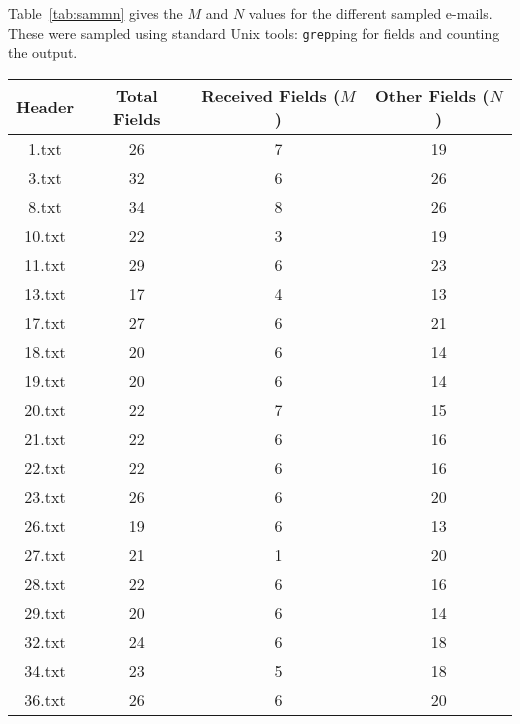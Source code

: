 Table~\ref{tab:sammn} gives the $M$ and $N$ values for the different sampled e-mails.  These were sampled using standard Unix tools: \texttt{grep}ping for fields and counting the output.

\begin{table}
\centering
\begin{tabular}{@{}cccc@{}}
\toprule
Header & Total Fields & Received Fields ($M$) & Other Fields ($N$) \\ \midrule
1.txt  & 26           & 7                     & 19                 \\
3.txt  & 32           & 6                     & 26                 \\
8.txt  & 34           & 8                     & 26                 \\
10.txt & 22           & 3                     & 19                 \\
11.txt & 29           & 6                     & 23                 \\
13.txt & 17           & 4                     & 13                 \\
17.txt & 27           & 6                     & 21                 \\
18.txt & 20           & 6                     & 14                 \\
19.txt & 20           & 6                     & 14                 \\
20.txt & 22           & 7                     & 15                 \\
21.txt & 22           & 6                     & 16                 \\
22.txt & 22           & 6                     & 16                 \\
23.txt & 26           & 6                     & 20                 \\
26.txt & 19           & 6                     & 13                 \\
27.txt & 21           & 1                     & 20                 \\
28.txt & 22           & 6                     & 16                 \\
29.txt & 20           & 6                     & 14                 \\
32.txt & 24           & 6                     & 18                 \\
34.txt & 23           & 5                     & 18                 \\
36.txt & 26           & 6                     & 20                 \\

\end{tabular}
\end{table}
